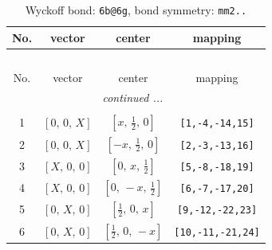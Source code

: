 \documentclass[fleqn,8pt]{jsarticle}
\begin{document}
\renewcommand{\arraystretch}{1.2}
\begin{longtable}{cccc}
\caption{Wyckoff bond: {\tt 6b@6g}, bond symmetry: {\tt mm2..}}
 \\
 \hline \hline
No. & vector & center & mapping \\ \hline \endfirsthead

\multicolumn{3}{l}{\tablename\ \thetable{}} \\
 \hline \hline
No. & vector & center & mapping \\ \hline \endhead

 \hline \hline
\multicolumn{3}{r}{\footnotesize\it continued ...} \\ \endfoot

 \hline \hline
\multicolumn{3}{r}{} \\ \endlastfoot

1 & $\left[ 0,\, 0,\, X \right]$ & $\left[ x,\, \frac{1}{2},\, 0 \right]$ & {\tt [1,-4,-14,15]} \\ \hline
2 & $\left[ 0,\, 0,\, X \right]$ & $\left[ - x,\, \frac{1}{2},\, 0 \right]$ & {\tt [2,-3,-13,16]} \\ \hline
3 & $\left[ X,\, 0,\, 0 \right]$ & $\left[ 0,\, x,\, \frac{1}{2} \right]$ & {\tt [5,-8,-18,19]} \\ \hline
4 & $\left[ X,\, 0,\, 0 \right]$ & $\left[ 0,\, - x,\, \frac{1}{2} \right]$ & {\tt [6,-7,-17,20]} \\ \hline
5 & $\left[ 0,\, X,\, 0 \right]$ & $\left[ \frac{1}{2},\, 0,\, x \right]$ & {\tt [9,-12,-22,23]} \\ \hline
6 & $\left[ 0,\, X,\, 0 \right]$ & $\left[ \frac{1}{2},\, 0,\, - x \right]$ & {\tt [10,-11,-21,24]} \\
\end{longtable}
\renewcommand{\arraystretch}{1.2}
\end{document}
